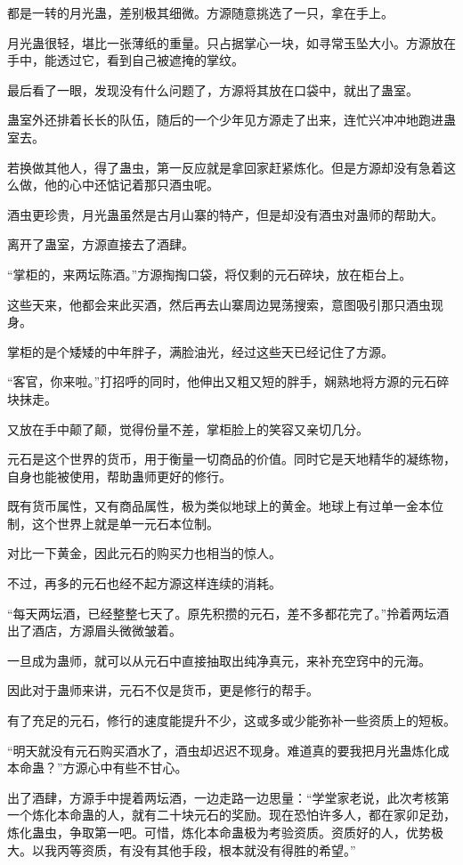 \begin{this_body}
都是一转的月光蛊，差别极其细微。方源随意挑选了一只，拿在手上。

月光蛊很轻，堪比一张薄纸的重量。只占据掌心一块，如寻常玉坠大小。方源放在手中，能透过它，看到自己被遮掩的掌纹。

最后看了一眼，发现没有什么问题了，方源将其放在口袋中，就出了蛊室。

蛊室外还排着长长的队伍，随后的一个少年见方源走了出来，连忙兴冲冲地跑进蛊室去。

若换做其他人，得了蛊虫，第一反应就是拿回家赶紧炼化。但是方源却没有急着这么做，他的心中还惦记着那只酒虫呢。

酒虫更珍贵，月光蛊虽然是古月山寨的特产，但是却没有酒虫对蛊师的帮助大。

离开了蛊室，方源直接去了酒肆。

“掌柜的，来两坛陈酒。”方源掏掏口袋，将仅剩的元石碎块，放在柜台上。

这些天来，他都会来此买酒，然后再去山寨周边晃荡搜索，意图吸引那只酒虫现身。

掌柜的是个矮矮的中年胖子，满脸油光，经过这些天已经记住了方源。

“客官，你来啦。”打招呼的同时，他伸出又粗又短的胖手，娴熟地将方源的元石碎块抹走。

又放在手中颠了颠，觉得份量不差，掌柜脸上的笑容又亲切几分。

元石是这个世界的货币，用于衡量一切商品的价值。同时它是天地精华的凝练物，自身也能被使用，帮助蛊师更好的修行。

既有货币属性，又有商品属性，极为类似地球上的黄金。地球上有过单一金本位制，这个世界上就是单一元石本位制。

对比一下黄金，因此元石的购买力也相当的惊人。

不过，再多的元石也经不起方源这样连续的消耗。

“每天两坛酒，已经整整七天了。原先积攒的元石，差不多都花完了。”拎着两坛酒出了酒店，方源眉头微微皱着。

一旦成为蛊师，就可以从元石中直接抽取出纯净真元，来补充空窍中的元海。

因此对于蛊师来讲，元石不仅是货币，更是修行的帮手。

有了充足的元石，修行的速度能提升不少，这或多或少能弥补一些资质上的短板。

“明天就没有元石购买酒水了，酒虫却迟迟不现身。难道真的要我把月光蛊炼化成本命蛊？”方源心中有些不甘心。

出了酒肆，方源手中提着两坛酒，一边走路一边思量：“学堂家老说，此次考核第一个炼化本命蛊的人，就有二十块元石的奖励。现在恐怕许多人，都在家卯足劲，炼化蛊虫，争取第一吧。可惜，炼化本命蛊极为考验资质。资质好的人，优势极大。以我丙等资质，有没有其他手段，根本就没有得胜的希望。”


\end{this_body}
